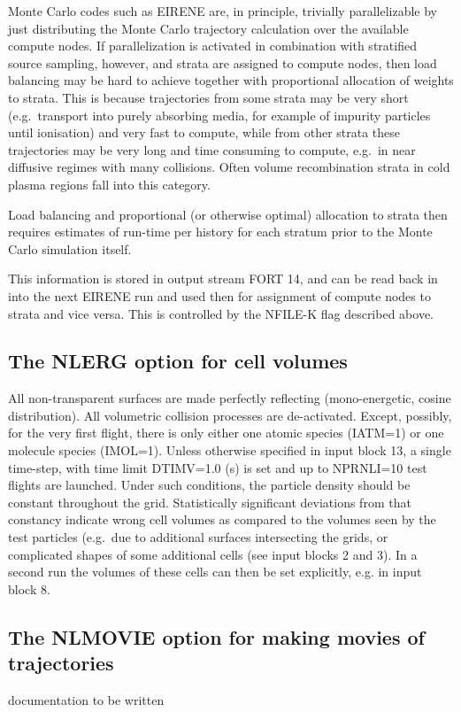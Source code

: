 Monte Carlo codes such as EIRENE are, in principle,  trivially parallelizable
by just distributing the Monte Carlo trajectory calculation over the available
compute nodes.
If parallelization is activated in combination with stratified source sampling,
however, and strata are assigned to compute nodes, then load balancing may be
hard to achieve together with proportional allocation of weights to strata.
This is because trajectories from some strata may be very short (e.g.\
transport into purely absorbing media, for example of impurity particles until
ionisation) and very fast to compute, while from other strata these
trajectories may be very long and time consuming to compute, e.g.\ in near
diffusive regimes with many collisions.
Often volume recombination strata in cold plasma regions fall into this
category.

Load balancing and proportional (or otherwise optimal) allocation to strata
then requires estimates of run-time per history for each stratum prior to the
Monte Carlo simulation itself.

This information is stored in output stream FORT 14, and can be read back in
into the next EIRENE run and used then for assignment of compute nodes to
strata and vice versa.
This is controlled by the NFILE-K flag described above.

\subsection{The NLERG option for cell volumes}\label{NLERG}

All non-transparent surfaces are made perfectly reflecting (mono-energetic,
cosine distribution).
All volumetric collision processes are de-activated.
Except, possibly, for the very first flight, there is only either one atomic
species (IATM=1) or one molecule species (IMOL=1).
Unless otherwise specified in input block 13, a single time-step, with time
limit DTIMV=\num{1.0} (\si{\second}) is set and up to NPRNLI=10 test flights
are launched.
Under such conditions, the particle density should be constant throughout the
grid.
Statistically significant deviations from that constancy indicate wrong cell
volumes as compared to the volumes seen by the test particles (e.g.\ due to
additional surfaces intersecting the grids, or complicated shapes of some
additional cells (see input blocks 2 and 3).
In a second run the volumes of these cells can then be set explicitly, e.g. in
input block 8.

\subsection{The NLMOVIE option for making movies of trajectories}\label{NLMOVIE}

documentation to be written
